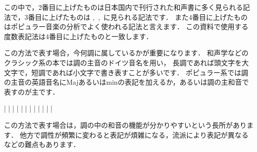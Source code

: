 \documentclass[dvipdfmx,uplatex,b5paper,openany,jbase=12Q,nomag*,textwidth-limit=44%
               ]{gachimuchi}
\begin{document}
この中で，2番目に上げたものは日本国内で刊行された和声書に多く見られる記法で，3番目に上げたものは
,\ \cite{chSHIMAOKA1ii},\ \cite{chSHIMAOKA1iii}に見られる記法です．
また4番目に上げたものはポピュラー音楽の分析でよく使われる記法と言えます．
この資料で使用する度数表記法は4番目に上げたものと一致します．

この方法で表す場合，今何調に属しているかが重要になります．
和声学などのクラシック系の本では調の主音のドイツ音名を用い，
長調であれば頭文字を大文字で，短調であれば小文字で書き表すことが多いです．
ポピュラー系では調の主音の英語音名にMajあるいはminの表記を加えるか，あるいは調の主和音で表すのが主です．

\begin{floatMusic}[pos=ht,width=0.9\linewidth]
  \Startpiece%
  \Notes%
  \zchordsl{\Gni}\cchordsu{}%
  |%
  \en%
  \Notes%
  \zchordsl{\Gni}\figbassu[6]%
  |%
  \en%
  \Notes%
  \zchordsl{\Gni}\figbassu[4][6]%
  |%
  \en\doublebar%
  \Notes%
  \zchordsl{\Gni}%
  |%
  \en%
  \Notes%
  |%
  \en%
  \Notes%
  |%
  \en\doublebar%
  \Notes%
  \zchordsl{\Gni}%
  |%
  \en%
  \Notes%
  |%
  \en%
  \Notes%
  |%
  \en\doublebar%
  \Notes%
  \zchordsl{\Gni}%
  |%
  \en%
  \Notes%
  \zchordsl{\Gni/\Gniii}%
  |%
  \en%
  \Notes%
  \zchordsl{\Gni/\Gnv}%
  |%
  \en\setdoublebar%
  \endpiece%
\end{floatMusic}

この方法で表す場合は，調の中の和音の機能が分かりやすいという長所があります．
他方で調性が頻繁に変わると表記が煩雑になる，流派により表記が異なるなどの難点もあります．
\end{document}
